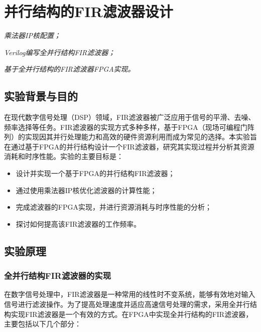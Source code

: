 \chapter{并行结构的FIR滤波器设计}
\begin{introduction}
  \item \textit{乘法器IP核配置；}
  \item \textit{Verilog编写全并行结构FIR滤波器；}
  \item \textit{基于全并行结构的FIR滤波器FPGA实现。}
\end{introduction}
\section{实验背景与目的}
在现代数字信号处理（DSP）领域，FIR滤波器被广泛应用于信号的平滑、去噪、频率选择等任务。FIR滤波器的实现方式多种多样，基于FPGA（现场可编程门阵列）的实现因其并行处理能力和高效的硬件资源利用而成为常见的选择。本实验旨在通过基于FPGA的并行结构设计一个FIR滤波器，研究其实现过程并分析其资源消耗和时序性能。实验的主要目标是：
\begin{itemize}
    \item 设计并实现一个基于FPGA的并行结构FIR滤波器；
    \item 通过使用乘法器IP核优化滤波器的计算性能；
    \item 完成滤波器的FPGA实现，并进行资源消耗与时序性能的分析；
    \item 探讨如何提高该FIR滤波器的工作频率。
\end{itemize}

\section{实验原理}


\subsection{全并行结构FIR滤波器的实现}

在数字信号处理中，FIR滤波器是一种常用的线性时不变系统，能够有效地对输入信号进行滤波操作。为了提高处理速度并适应高速信号处理的需求，采用全并行结构实现FIR滤波器是一个有效的方式。在FPGA中实现全并行结构的FIR滤波器，主要包括以下几个部分：


